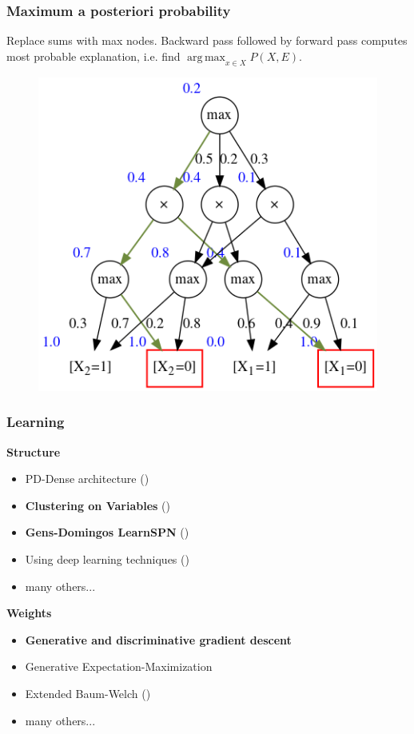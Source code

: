 \documentclass{beamer}
\DeclareMathOperator*{\argmax}{arg\,max}
\begin{document}
\begin{frame}
  \frametitle{Maximum a posteriori probability}

  Replace sums with max nodes. Backward pass followed by forward pass computes most probable
  explanation, i.e. find $\argmax_{x\in X} P(X, E)$.

  \begin{figure}
    \centering\includegraphics[height=0.6\textheight]{imgs/sample_mpn_prob.png}
  \end{figure}
\end{frame}

\begin{frame}
  \frametitle{Learning}

  \textbf{Structure}
  \begin{itemize}
    \item PD-Dense architecture (\cite{poon-domingos})
    \item \textbf{Clustering on Variables} (\cite{clustering})
    \item \textbf{Gens-Domingos LearnSPN} (\cite{gens-domingos})
    \item Using deep learning techniques (\cite{deep-learn-spn})
    \item many others...
  \end{itemize}

  \textbf{Weights}
  \begin{itemize}
    \item \textbf{Generative and discriminative gradient descent}
    \item Generative Expectation-Maximization
    \item Extended Baum-Welch (\cite{baum-welch})
    \item many others...
  \end{itemize}
\end{frame}
\end{document}
